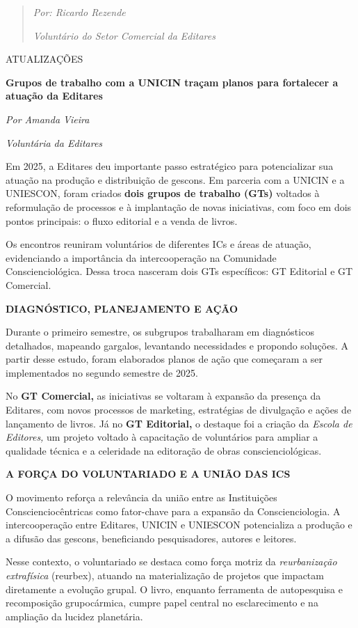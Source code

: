 \begin{quote}
\emph{Por: Ricardo Rezende}

\emph{Voluntário do Setor Comercial da Editares}
\end{quote}

ATUALIZAÇÕES

\textbf{Grupos de trabalho com a UNICIN traçam planos para fortalecer a atuação da Editares}

\emph{Por Amanda Vieira}

\emph{Voluntária da Editares}

Em 2025, a Editares deu importante passo estratégico para potencializar sua atuação na produção e distribuição de gescons. Em parceria com a UNICIN e a UNIESCON, foram criados \textbf{dois grupos de trabalho (GTs)} voltados à reformulação de processos e à implantação de novas iniciativas, com foco em dois pontos principais: o fluxo editorial e a venda de livros.

Os encontros reuniram voluntários de diferentes ICs e áreas de atuação, evidenciando a importância da intercooperação na Comunidade Conscienciológica. Dessa troca nasceram dois GTs específicos: GT Editorial e GT Comercial.

\textbf{DIAGNÓSTICO, PLANEJAMENTO E AÇÃO}

Durante o primeiro semestre, os subgrupos trabalharam em diagnósticos detalhados, mapeando gargalos, levantando necessidades e propondo soluções. A partir desse estudo, foram elaborados planos de ação que começaram a ser implementados no segundo semestre de 2025.

No \textbf{GT Comercial,} as iniciativas se voltaram à expansão da presença da Editares, com novos processos de marketing, estratégias de divulgação e ações de lançamento de livros. Já no \textbf{GT Editorial,} o destaque foi a criação da \emph{Escola de Editores,} um projeto voltado à capacitação de voluntários para ampliar a qualidade técnica e a celeridade na editoração de obras conscienciológicas.

\textbf{A FORÇA DO VOLUNTARIADO E A UNIÃO DAS ICS}

O movimento reforça a relevância da união entre as Instituições Conscienciocêntricas como fator-chave para a expansão da Conscienciologia. A intercooperação entre Editares, UNICIN e UNIESCON potencializa a produção e a difusão das gescons, beneficiando pesquisadores, autores e leitores.

Nesse contexto, o voluntariado se destaca como força motriz da \emph{reurbanização extrafísica} (reurbex), atuando na materialização de projetos que impactam diretamente a evolução grupal. O livro, enquanto ferramenta de autopesquisa e recomposição grupocármica, cumpre papel central no esclarecimento e na ampliação da lucidez planetária.

